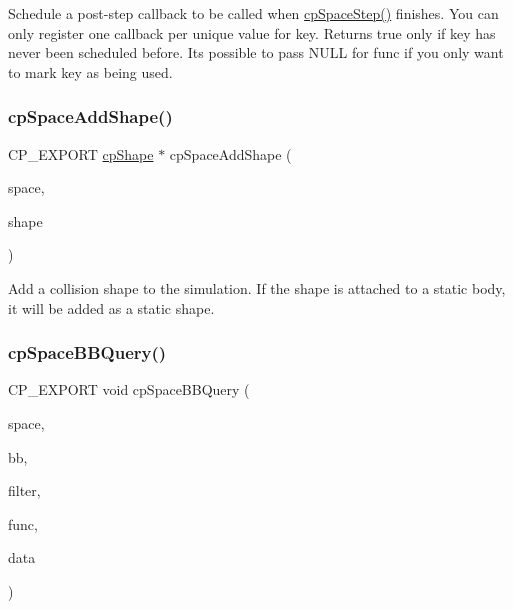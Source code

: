 Schedule a post-\/step callback to be called when \hyperlink{group__cpSpace_gae87c828de2fe3709393ba94046212d80}{cp\+Space\+Step()} finishes. You can only register one callback per unique value for {\ttfamily key}. Returns true only if {\ttfamily key} has never been scheduled before. It\textquotesingle{}s possible to pass {\ttfamily N\+U\+LL} for {\ttfamily func} if you only want to mark {\ttfamily key} as being used. \mbox{\label{group__cpSpace_gad5728f811290d821c009d1d07b62c06a}} 
\subsubsection{\texorpdfstring{cp\+Space\+Add\+Shape()}{cpSpaceAddShape()}}
{\footnotesize\ttfamily C\+P\+\_\+\+E\+X\+P\+O\+RT \hyperlink{structcpShape}{cp\+Shape} $\ast$ cp\+Space\+Add\+Shape (\begin{DoxyParamCaption}\item[{\hyperlink{structcpSpace}{cp\+Space} $\ast$}]{space,  }\item[{\hyperlink{structcpShape}{cp\+Shape} $\ast$}]{shape }\end{DoxyParamCaption})}

Add a collision shape to the simulation. If the shape is attached to a static body, it will be added as a static shape. \mbox{\label{group__cpSpace_ga09e4737a3b33755ee20066297138b64e}} 
\subsubsection{\texorpdfstring{cp\+Space\+B\+B\+Query()}{cpSpaceBBQuery()}}
{\footnotesize\ttfamily C\+P\+\_\+\+E\+X\+P\+O\+RT void cp\+Space\+B\+B\+Query (\begin{DoxyParamCaption}\item[{\hyperlink{structcpSpace}{cp\+Space} $\ast$}]{space,  }\item[{\hyperlink{structcpBB}{cp\+BB}}]{bb,  }\item[{\hyperlink{structcpShapeFilter}{cp\+Shape\+Filter}}]{filter,  }\item[{\hyperlink{group__cpSpace_ga02779238e9b8c07797aae6139fad203c}{cp\+Space\+B\+B\+Query\+Func}}]{func,  }\item[{void $\ast$}]{data }\end{DoxyParamCaption})}

